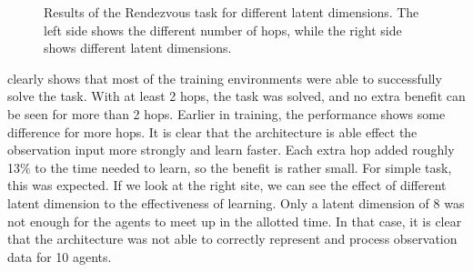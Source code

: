 \begin{figure}[htp]
    \centering
    \hspace{1cm}                       
    \caption{Results of the Rendezvous task for different latent dimensions. The left side shows the different number of hops, while the right side shows different latent dimensions.}
    \label{fig:proof_of_concept_rendezvous}
\end{figure}

 clearly shows that most of the training environments were able to successfully solve the task. With at least 2 hops, the task was solved, and no extra benefit can be seen for more than 2 hops. Earlier in training, the performance shows some difference for more hops. It is clear that the architecture is able effect the observation input more strongly and learn faster. Each extra hop added roughly 13$\%$ to the time needed to learn, so the benefit is rather small. For simple task, this was expected. If we look at the right site, we can see the effect of different latent dimension to the effectiveness of learning. Only a latent dimension of 8 was not enough for the agents to meet up in the allotted time. In that case, it is clear that the architecture was not able to correctly represent and process observation data for 10 agents.\par


